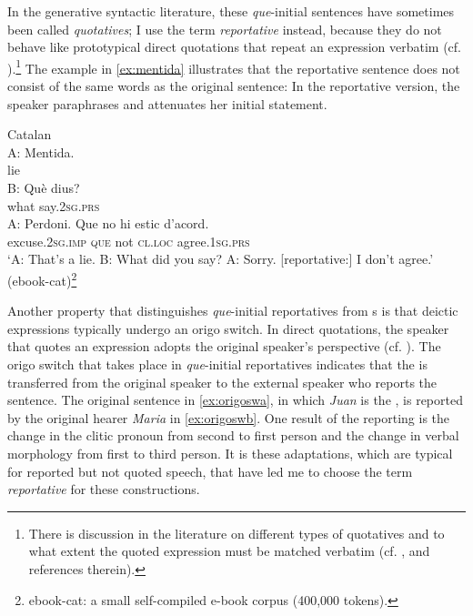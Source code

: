In the generative syntactic literature, these \emph{que}-initial sentences have sometimes been called \emph{quotatives}; I use the term \emph{reportative} instead,  because they do not behave like prototypical direct quotations that repeat an expression verbatim (cf. \citealt[2]{Coulmas1986}).\footnote{There is  discussion in the literature on different types of quotatives and  to what extent  the quoted expression must be matched verbatim (cf. \citealt{Davidson1968,Cappelen1997,Cappelen2003,Cappelen2005,Maldonada1999,Abbott2003}, and references therein).} The example in \eqref{ex:mentida} illustrates that the reportative sentence does not consist of the same words as the original sentence: In the reportative version, the  speaker paraphrases and attenuates her initial statement.

\ea\label{ex:mentida} Catalan\\ 
\gll A: Mentida. \\
	{} lie\\
	\exi{} \gll B: Què dius?\\
	{} what say.\textsc{2sg.prs}\\
	\exi{}\gll A: Perdoni. Que no hi {estic d’acord}.\\
	{} excuse.\textsc{2sg.imp} \textsc{que} not \textsc{cl.loc} agree.\textsc{1sg.prs} \\
	\glt `A: That's a lie. B: What did you say? A: Sorry. [reportative:] I don't agree.' (ebook-cat)\footnote{ebook-cat: a small self-compiled e-book corpus (400,000 tokens).}
\z

Another property that distinguishes  \emph{que}-initial reportatives from s is that deictic expressions  typically undergo an origo switch. In direct quotations, the speaker that quotes an expression adopts the original speaker's perspective (cf. \citealt[2]{Coulmas1986}). The origo switch that takes place in \emph{que}-initial reportatives indicates  that the  is transferred from the original speaker to the external speaker who reports the sentence.  The original sentence in \eqref{ex:origoswa}, in which \emph{Juan} is the , is reported by the original hearer \emph{Maria} in \eqref{ex:origoswb}. One result of the reporting is the change in the clitic pronoun from second to first person and the change in verbal morphology from first to third person. It is these adaptations, which are typical for reported but not quoted speech, that have led me to choose the term \textit{reportative} for these constructions.\largerpage[-1]

